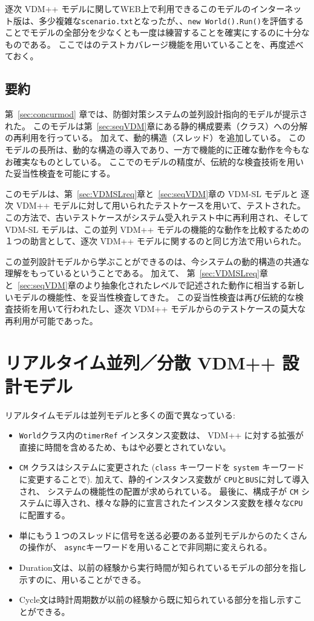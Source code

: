 \documentclass[\pformat,12pt]{jreport}
\begin{document}
逐次 VDM++ モデルに関してWEB上で利用できるこのモデルのインターネット版は、多少複雑な\texttt{scenario.txt}となったが、、\texttt{new World().Run()}を評価することでモデルの全部分を少なくとも一度は練習することを確実にするのに十分なものである。
ここでは\VDMTools のテストカバレージ機能を用いていることを、再度述べておく。

\subsection{要約}

第~\ref{sec:concurmod} 章では、防御対策システムの並列設計指向的モデルが提示された。
このモデルは第~\ref{sec:seqVDM}章にある静的構成要素（クラス）への分解の再利用を行っている。
加えて、動的構造（スレッド）を追加している。
このモデルの長所は、動的な構造の導入であり、一方で機能的に正確な動作を今もなお確実なものとしている。
ここでのモデルの精度が、伝統的な検査技術を用いた妥当性検査を可能にする。

このモデルは、第~\ref{sec:VDMSLreq}章と~\ref{sec:seqVDM}章の VDM-SL モデルと 逐次 VDM++ モデルに対して用いられたテストケースを用いて、テストされた。
この方法で、古いテストケースがシステム受入れテスト中に再利用され、そしてVDM-SL モデルは、この並列 VDM++ モデルの機能的な動作を比較するための１つの助言として、逐次 VDM++ モデルに関するのと同じ方法で用いられた。

この並列設計モデルから学ぶことができるのは、今システムの動的構造の共通な理解をもっているということである。
加えて、 第~\ref{sec:VDMSLreq}章と~\ref{sec:seqVDM}章のより抽象化されたレベルで記述された動作に相当する新しいモデルの機能性、を妥当性検査してきた。
この妥当性検査は再び伝統的な検査技術を用いて行われたし、逐次 VDM++ モデルからのテストケースの莫大な再利用が可能であった。

\section{リアルタイム並列／分散 VDM++ 設計モデル}\label{sec:realtime}

リアルタイムモデルは並列モデルと多くの面で異なっている:

\begin{itemize}
\item  \texttt{World}クラス内の\texttt{timerRef} インスタンス変数は、 VDM++ に対する拡張が直接に時間を含めるため、もはや必要とされていない。
\item  \texttt{CM} クラスはシステムに変更された (\texttt{class} キーワードを \texttt{system} キーワードに変更することで). 
加えて、静的インスタンス変数が \texttt{CPU}と\texttt{BUS}に対して導入され、 システムの機能性の配置が求められている。
最後に、構成子が \texttt{CM} システムに導入され、様々な静的に宣言されたインスタンス変数を様々な\texttt{CPU}に配置する。
\item 単にもう１つのスレッドに信号を送る必要のある並列モデルからのたくさんの操作が、 \texttt{async}キーワードを用いることで非同期に変えられる。
\item Duration文は、以前の経験から実行時間が知られているモデルの部分を指し示すのに、用いることができる。
\item Cycle文は時計周期数が以前の経験から既に知られている部分を指し示すことができる。
\end{itemize}
\end{document}
